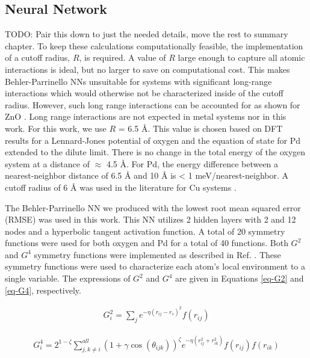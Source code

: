 \documentclass[12pt]{cmuthesis}
\begin{document}
\subsection{Neural Network}
\label{sec:org6f0dd28}
TODO: Pair this down to just the needed details, move the rest to summary chapter.
To keep these calculations computationally feasible, the implementation of a cutoff radius, \(R\), is required. A value of \(R\) large enough to capture all atomic interactions is ideal, but no larger to save on computational cost. This makes Behler-Parrinello NNs unsuitable for systems with significant long-range interactions which would otherwise not be characterized inside of the cutoff radius. However, such long range interactions can be accounted for as shown for ZnO \cite{artrith-2011-high}. Long range interactions are not expected in metal systems nor in this work. For this work, we use \(R\) = 6.5 \AA{}. This value is chosen based on DFT results for a Lennard-Jones potential of oxygen and the equation of state for Pd extended to the dilute limit. There is no change in the total energy of the oxygen system at a distance of \(\approx\) 4.5 \AA{}. For Pd, the energy difference between a nearest-neighbor distance of 6.5 \AA{} and 10 \AA{} is < 1 meV/nearest-neighbor. A cutoff radius of 6 \AA{} was used in the literature for Cu systems \cite{artrith-2012-high}.

The Behler-Parrinello NN we produced with the lowest root mean squared error (RMSE) was used in this work. This NN utilizes 2 hidden layers with 2 and 12 nodes and a hyperbolic tangent activation function. A total of 20 symmetry functions were used for both oxygen and Pd for a total of 40 functions. Both \(G^{2}\) and \(G^{4}\) symmetry functions were implemented as described in Ref. . These symmetry functions were used to characterize each atom's local environment to a single variable. The expressions of \(G^{2}\) and \(G^{4}\) are given in Equations \ref{eq-G2} and \ref{eq-G4}, respectively.

\begin{eqnarray} \label{eq-G2}
G_{i}^{2} = \sum_{j}e^{-\eta(r_{ij} - r_{s})^2} f(r_{ij})
\end{eqnarray}

\begin{eqnarray} \label{eq-G4}
G_{i}^{4} = 2^{1-\zeta} \sum^{all}_{j,k \neq i} (1 + \gamma \cos\left(\theta_{ijk}\right))^{\zeta} e^{-\eta(r^{2}_{ij}+r_{ik}^2)} f(r_{ij}) f(r_{ik})
\end{eqnarray}
\end{document}

